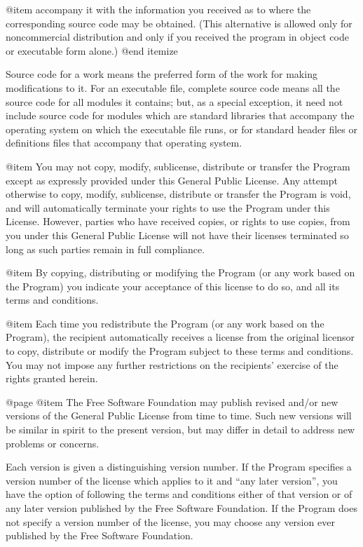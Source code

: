 @item
accompany it with the information you received as to where the
corresponding source code may be obtained.  (This alternative is
allowed only for noncommercial distribution and only if you
received the program in object code or executable form alone.)
@end itemize

Source code for a work means the preferred form of the work for making
modifications to it.  For an executable file, complete source code means
all the source code for all modules it contains; but, as a special
exception, it need not include source code for modules which are standard
libraries that accompany the operating system on which the executable
file runs, or for standard header files or definitions files that
accompany that operating system.

@item
You may not copy, modify, sublicense, distribute or transfer the
Program except as expressly provided under this General Public License.
Any attempt otherwise to copy, modify, sublicense, distribute or transfer
the Program is void, and will automatically terminate your rights to use
the Program under this License.  However, parties who have received
copies, or rights to use copies, from you under this General Public
License will not have their licenses terminated so long as such parties
remain in full compliance.

@item
By copying, distributing or modifying the Program (or any work based
on the Program) you indicate your acceptance of this license to do so,
and all its terms and conditions.

@item
Each time you redistribute the Program (or any work based on the
Program), the recipient automatically receives a license from the original
licensor to copy, distribute or modify the Program subject to these
terms and conditions.  You may not impose any further restrictions on the
recipients' exercise of the rights granted herein.

@page
@item
The Free Software Foundation may publish revised and/or new versions
of the General Public License from time to time.  Such new versions will
be similar in spirit to the present version, but may differ in detail to
address new problems or concerns.

Each version is given a distinguishing version number.  If the Program
specifies a version number of the license which applies to it and ``any
later version'', you have the option of following the terms and conditions
either of that version or of any later version published by the Free
Software Foundation.  If the Program does not specify a version number of
the license, you may choose any version ever published by the Free Software
Foundation.

